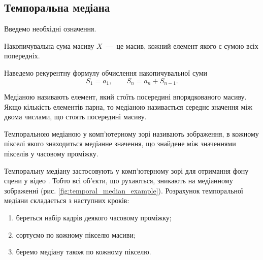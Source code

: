 \subsection{Темпоральна медіана}

Введемо необхідні означення.

\begin{definition}
    Накопичувальна сума масиву \cite{bib:integral_image} $X$~---~це масив, кожний елемент 
    якого є сумою всіх попередніх.
\end{definition}

Наведемо рекурентну формулу обчислення накопичувальної суми
\begin{equation}
    S_1 = a_1, \qquad S_n = a_n + S_{n-1}.
    \label{eq:summed_table_formula}
\end{equation}

\begin{definition}
    Медіаною \cite{bib:median_in_statistics} називають елемент, який стоїть посередині впорядкованого масиву.
    Якщо кількість елементів парна, то медіаною називається середнє значення між двома числами,
    що стоять посередині масиву.
\end{definition}

\begin{definition}
    Темпоральною медіаною у комп'ютерному зорі називають зображення,
    в кожному пікселі якого знаходиться медіанне значення, що знайдене між значеннями 
    пікселів у часовому проміжку.
\end{definition}

Темпоральну медіану застосовують у комп'ютерному зорі для отримання
фону сцени у відео \cite{bib:temporal_median_example}.
Тобто всі об'єкти, що рухаються, зникають на медіанному зображенні
(рис. \ref{fig:temporal_median_example}).
Розрахунок темпоральної медіани складається з наступних кроків:
\begin{enumerate}
    \item береться набір кадрів деякого часовому проміжку;
    \item сортуємо по кожному пікселю масиви;
    \item беремо медіану також по кожному пікселю.
\end{enumerate}

